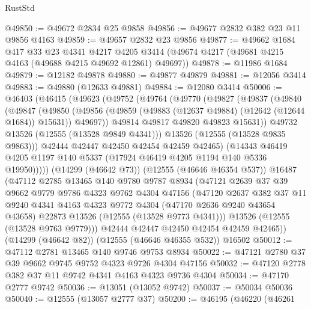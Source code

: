 \begin{lexlean}{RustStd}
\begin{coremodule}
@49850 := @49672 @2834 @25 @9858
@49856 := @49677 @2832 @382 @23 @11 @9856 @4163
@49859 := @49657 @2832 @23 @9856
@49877 := @49662
    @1684
    @417
    @33
    @23
    @4341
    @4217
    @4205
    @3414
    (@49674 @4217 (@49681 @4215 @4163 (@49688 @4215 @49692 @12861) @49697))
@49878 := @11986 @1684
@49879 := @12182 @49878
@49880 := @49877 @49879
@49881 := @12056 @3414
@49883 := @49880 (@12633 @49881)
@49884 := @12080 @3414
@50006 := @46403
    (@46415
      (@49623
        (@49752
          (@49764
            (@49770
              (@49827
                (@49837
                  (@49840
                    (@49847
                      (@49850
                        (@49856
                          (@49859 (@49883 (@12637 @49884) (@12642 (@12644 @1684)) @15631))
                          @49697))
                      @49814
                      @49817
                      @49820
                      @49823
                      @15631))
                  @49732
                  @13526
                  (@12555 (@13528 @9849 @4341)))
                @13526
                (@12555 (@13528 @9835 @9863)))
              @42444
              @42447
              @42450
              @42454
              @42459
              @42465)
            (@14343 @46419 @4205 @1197 @140 @5337 (@17924 @46419 @4205 @1194 @140 @5336 @19950)))))
      (@14299 (@46642 @73))
      (@12555 (@46646 @46354 @537))
      @16487
      (@47112
        @2785
        @13465
        @140
        @9780
        @9787
        @8934
        (@47121
          @2639
          @37
          @39
          @9662
          @9779
          @9786
          @4323
          @9762
          @4304
          @47156
          (@47120
            @2637
            @382
            @37
            @11
            @9240
            @4341
            @4163
            @4323
            @9772
            @4304
            (@47170 @2636 @9240 @43654 @43658)
            @22873
            @13526
            (@12555 (@13528 @9773 @4341)))
          @13526
          (@12555 (@13528 @9763 @9779)))
        @42444
        @42447
        @42450
        @42454
        @42459
        @42465))
    (@14299 (@46642 @82))
    (@12555 (@46646 @46355 @532))
    @16502
@50012 := @47112 @2781 @13465 @140 @9746 @9753 @8934
@50022 := @47121 @2780 @37 @39 @9662 @9745 @9752 @4323 @9726 @4304 @47156
@50032 := @47120 @2778 @382 @37 @11 @9742 @4341 @4163 @4323 @9736 @4304
@50034 := @47170 @2777 @9742
@50036 := @13051 (@13052 @9742)
@50037 := @50034 @50036
@50040 := @12555 (@13057 @2777 @37)
@50200 := @46195
    (@46220
      (@46261

\end{coremodule}
\end{lexlean}

